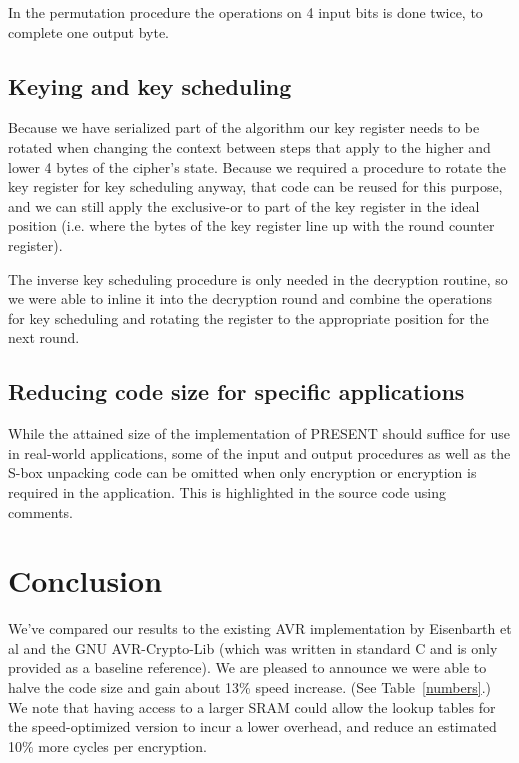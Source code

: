 \documentclass[11pt]{article}
\begin{document}
In the permutation procedure the operations on 4 input bits is done twice, to complete one output byte.

\subsection{Keying and key scheduling}
Because we have serialized part of the algorithm our key register needs to be rotated when changing the context between steps that apply to the higher and lower 4 bytes of the cipher's state.
Because we required a procedure to rotate the key register for key scheduling anyway, that code can be reused for this purpose, and we can still apply the exclusive-or to part of the key register in the ideal position (i.e. where the bytes of the key register line up with the round counter register).

The inverse key scheduling procedure is only needed in the decryption routine, so we were able to inline it into the decryption round and combine the operations for key scheduling and rotating the register to the appropriate position for the next round.

\subsection{Reducing code size for specific applications}
While the attained size of the implementation of PRESENT should suffice for use in real-world applications, some of the input and output procedures as well as the S-box unpacking code can be omitted when only encryption or encryption is required in the application.
This is highlighted in the source code using comments.

\section{Conclusion}
We've compared our results to the existing AVR implementation by Eisenbarth et al \cite{eisenbarth2012compact} and the GNU AVR-Crypto-Lib \cite{avr_crypto_lib} (which was written in standard C and is only provided as a baseline reference).
We are pleased to announce we were able to halve the code size and gain about 13\% speed increase. (See Table~\ref{numbers}.)
We note that having access to a larger SRAM could allow the lookup tables for the speed-optimized version to incur a lower overhead, and reduce an estimated 10\% more cycles per encryption. 
\\
\end{document}
